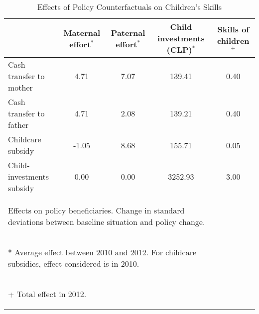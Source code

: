 \begin{table}[H]
\centering
\begingroup\footnotesize
\begin{tabular}{lcccc}
  \hline
 & Maternal effort$^*$ & Paternal effort$^*$ & Child investments (CLP)$^*$ & Skills of children$^+$ \\ 
  \hline
Cash transfer to mother & 4.71 & 7.07 & 139.41 & 0.40 \\ 
  Cash transfer to father & 4.71 & 2.08 & 139.21 & 0.40 \\ 
  Childcare subsidy & -1.05 & 8.68 & 155.71 & 0.05 \\ 
  Child-investments subsidy & 0.00 & 0.00 & 3252.93 & 3.00 \\ 
   \hline 
\multicolumn{4}{l}{ \begin{tiny}  Effects on policy beneficiaries. Change in standard deviations between baseline situation and policy change.\end{tiny}  }\\ 
\multicolumn{4}{l}{\begin{tiny}  * Average effect between 2010 and 2012. For childcare subsidies, effect considered is in 2010.\end{tiny}   }\\ 
\multicolumn{4}{l}{\begin{tiny}  + Total effect in 2012.\end{tiny}   }\\ 
\end{tabular}
\endgroup
\caption{Effects of Policy Counterfactuals on Children's Skills} 
\label{tab:TablePolicychangeR2}
\end{table}

